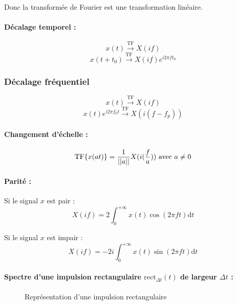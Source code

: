 \documentclass[a4paper,12pt]{article}
\begin{document}
Donc la transformée de Fourier est une transformation linéaire.

\paragraph{Décalage temporel :}

\[ x(t) \xrightarrow{\mathrm{TF}} X(if) \]
\[ x(t + t_0) \xrightarrow{\mathrm{TF}} X(if) e^{i2\pi ft_0} \]

\subsubsection{Décalage fréquentiel}

\[ x(t) \xrightarrow{\mathrm{TF}} X(if) \]
\[ x(t) e^{i2\pi f_0t} \xrightarrow{\mathrm{TF}} X(i(f-f_p)) \]

\paragraph{Changement d'échelle :}

\[ \mathrm{TF} \{  x(at) \} = \dfrac{1}{||a||} X(i(\dfrac{f}{a})) \text{ avec } a \neq 0 \]

\paragraph{Parité :}

Si le signal $x$ est pair :
\[ X(if) = 2 \int_{0}^{+\infty} x(t) \cos(2\pi ft) \mathrm{d}t \]

Si le signal $x$ est impair :
\[ X(if) = -2i \int_{0}^{+\infty} x(t) \sin(2\pi ft) \mathrm{d}t \]

\paragraph{Spectre d'une impulsion rectangulaire $\mathrm{rect}_{\Delta t}(t)$ de largeur $\Delta t$ :}

\begin{figure}[!htbp]
	\centering
	\caption{Représentation d'une impulsion rectangulaire}
\end{figure}
\end{document}
